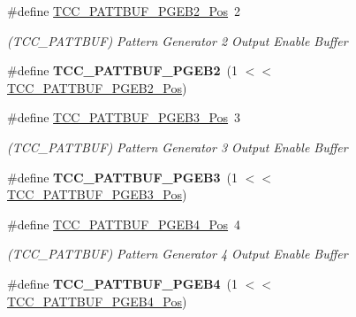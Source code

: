 \begin{DoxyCompactItemize}
\item 
\hypertarget{group___s_a_m_l21___t_c_c_ga51794f5b4a1e9298fe52faad0b52cec5}{}\#define \hyperlink{group___s_a_m_l21___t_c_c_ga51794f5b4a1e9298fe52faad0b52cec5}{T\+C\+C\+\_\+\+P\+A\+T\+T\+B\+U\+F\+\_\+\+P\+G\+E\+B2\+\_\+\+Pos}~2\label{group___s_a_m_l21___t_c_c_ga51794f5b4a1e9298fe52faad0b52cec5}

\begin{DoxyCompactList}\small\item\em (T\+C\+C\+\_\+\+P\+A\+T\+T\+B\+U\+F) Pattern Generator 2 Output Enable Buffer \end{DoxyCompactList}\item 
\hypertarget{group___s_a_m_l21___t_c_c_gafc83d4580a0873ec9dd50f228cda8ddc}{}\#define {\bfseries T\+C\+C\+\_\+\+P\+A\+T\+T\+B\+U\+F\+\_\+\+P\+G\+E\+B2}~(1 $<$$<$ \hyperlink{group___s_a_m_l21___t_c_c_ga51794f5b4a1e9298fe52faad0b52cec5}{T\+C\+C\+\_\+\+P\+A\+T\+T\+B\+U\+F\+\_\+\+P\+G\+E\+B2\+\_\+\+Pos})\label{group___s_a_m_l21___t_c_c_gafc83d4580a0873ec9dd50f228cda8ddc}

\item 
\hypertarget{group___s_a_m_l21___t_c_c_ga22752a7b42115e8eacb3e2bcc10ea7ac}{}\#define \hyperlink{group___s_a_m_l21___t_c_c_ga22752a7b42115e8eacb3e2bcc10ea7ac}{T\+C\+C\+\_\+\+P\+A\+T\+T\+B\+U\+F\+\_\+\+P\+G\+E\+B3\+\_\+\+Pos}~3\label{group___s_a_m_l21___t_c_c_ga22752a7b42115e8eacb3e2bcc10ea7ac}

\begin{DoxyCompactList}\small\item\em (T\+C\+C\+\_\+\+P\+A\+T\+T\+B\+U\+F) Pattern Generator 3 Output Enable Buffer \end{DoxyCompactList}\item 
\hypertarget{group___s_a_m_l21___t_c_c_gaa9447b7018e71758ed70b8c7f8c671e5}{}\#define {\bfseries T\+C\+C\+\_\+\+P\+A\+T\+T\+B\+U\+F\+\_\+\+P\+G\+E\+B3}~(1 $<$$<$ \hyperlink{group___s_a_m_l21___t_c_c_ga22752a7b42115e8eacb3e2bcc10ea7ac}{T\+C\+C\+\_\+\+P\+A\+T\+T\+B\+U\+F\+\_\+\+P\+G\+E\+B3\+\_\+\+Pos})\label{group___s_a_m_l21___t_c_c_gaa9447b7018e71758ed70b8c7f8c671e5}

\item 
\hypertarget{group___s_a_m_l21___t_c_c_ga245a049d349d78956db3979068a00109}{}\#define \hyperlink{group___s_a_m_l21___t_c_c_ga245a049d349d78956db3979068a00109}{T\+C\+C\+\_\+\+P\+A\+T\+T\+B\+U\+F\+\_\+\+P\+G\+E\+B4\+\_\+\+Pos}~4\label{group___s_a_m_l21___t_c_c_ga245a049d349d78956db3979068a00109}

\begin{DoxyCompactList}\small\item\em (T\+C\+C\+\_\+\+P\+A\+T\+T\+B\+U\+F) Pattern Generator 4 Output Enable Buffer \end{DoxyCompactList}\item 
\hypertarget{group___s_a_m_l21___t_c_c_ga38df2015be819f7d46cf812d43732c35}{}\#define {\bfseries T\+C\+C\+\_\+\+P\+A\+T\+T\+B\+U\+F\+\_\+\+P\+G\+E\+B4}~(1 $<$$<$ \hyperlink{group___s_a_m_l21___t_c_c_ga245a049d349d78956db3979068a00109}{T\+C\+C\+\_\+\+P\+A\+T\+T\+B\+U\+F\+\_\+\+P\+G\+E\+B4\+\_\+\+Pos})\label{group___s_a_m_l21___t_c_c_ga38df2015be819f7d46cf812d43732c35}


\end{DoxyCompactItemize}
